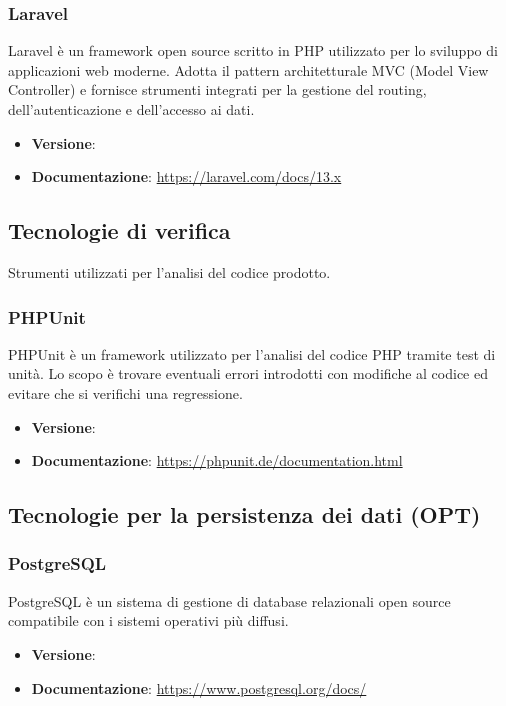 \documentclass[a4paper,10pt]{article}
\begin{document}
\subsubsection{Laravel}
Laravel è un framework open source scritto in PHP utilizzato per lo sviluppo di applicazioni web moderne. Adotta il pattern architetturale MVC (Model View Controller) e fornisce strumenti integrati per la gestione del routing, dell’autenticazione e dell’accesso ai dati.
\begin{itemize}
    \item \textbf{Versione}:
    \item \textbf{Documentazione}: \url{https://laravel.com/docs/13.x}
\end{itemize}


\subsection{Tecnologie di verifica}
Strumenti utilizzati per l'analisi del codice prodotto.

\subsubsection{PHPUnit}
PHPUnit è un framework utilizzato per l'analisi del codice PHP tramite test di unità. Lo scopo è trovare eventuali errori introdotti con modifiche al codice ed evitare che si verifichi una regressione.
\begin{itemize}
    \item \textbf{Versione}:
    \item \textbf{Documentazione}: \url{https://phpunit.de/documentation.html}
\end{itemize}

\subsection{Tecnologie per la persistenza dei dati (OPT)}

\subsubsection{PostgreSQL}
PostgreSQL è un sistema di gestione di database relazionali open source compatibile con i sistemi operativi più diffusi.
\begin{itemize}
    \item \textbf{Versione}:
    \item \textbf{Documentazione}: \url{https://www.postgresql.org/docs/}
\end{itemize}
\end{document}
